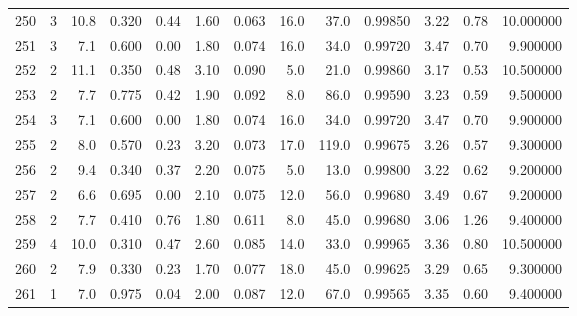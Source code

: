 \begin{tabular}{lrrrrrrrrrrrr}
250  &        3 &           10.8 &             0.320 &         0.44 &            1.60 &      0.063 &                 16.0 &                  37.0 &  0.99850 &  3.22 &       0.78 &  10.000000 \\
251  &        3 &            7.1 &             0.600 &         0.00 &            1.80 &      0.074 &                 16.0 &                  34.0 &  0.99720 &  3.47 &       0.70 &   9.900000 \\
252  &        2 &           11.1 &             0.350 &         0.48 &            3.10 &      0.090 &                  5.0 &                  21.0 &  0.99860 &  3.17 &       0.53 &  10.500000 \\
253  &        2 &            7.7 &             0.775 &         0.42 &            1.90 &      0.092 &                  8.0 &                  86.0 &  0.99590 &  3.23 &       0.59 &   9.500000 \\
254  &        3 &            7.1 &             0.600 &         0.00 &            1.80 &      0.074 &                 16.0 &                  34.0 &  0.99720 &  3.47 &       0.70 &   9.900000 \\
255  &        2 &            8.0 &             0.570 &         0.23 &            3.20 &      0.073 &                 17.0 &                 119.0 &  0.99675 &  3.26 &       0.57 &   9.300000 \\
256  &        2 &            9.4 &             0.340 &         0.37 &            2.20 &      0.075 &                  5.0 &                  13.0 &  0.99800 &  3.22 &       0.62 &   9.200000 \\
257  &        2 &            6.6 &             0.695 &         0.00 &            2.10 &      0.075 &                 12.0 &                  56.0 &  0.99680 &  3.49 &       0.67 &   9.200000 \\
258  &        2 &            7.7 &             0.410 &         0.76 &            1.80 &      0.611 &                  8.0 &                  45.0 &  0.99680 &  3.06 &       1.26 &   9.400000 \\
259  &        4 &           10.0 &             0.310 &         0.47 &            2.60 &      0.085 &                 14.0 &                  33.0 &  0.99965 &  3.36 &       0.80 &  10.500000 \\
260  &        2 &            7.9 &             0.330 &         0.23 &            1.70 &      0.077 &                 18.0 &                  45.0 &  0.99625 &  3.29 &       0.65 &   9.300000 \\
261  &        1 &            7.0 &             0.975 &         0.04 &            2.00 &      0.087 &                 12.0 &                  67.0 &  0.99565 &  3.35 &       0.60 &   9.400000 \\

\end{tabular}
